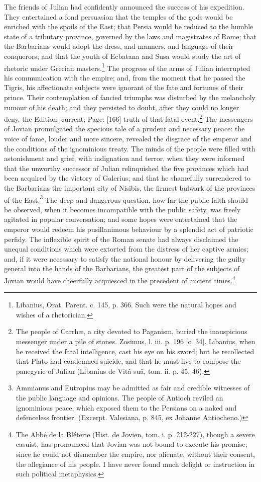 The friends of Julian had confidently announced the success of his expedition. They entertained a fond persuasion that the temples of the gods would be enriched with the spoils of the East; that Persia would be reduced to the humble state of a tributary province, governed by the laws and magistrates of Rome; that the Barbarians would adopt the dress, and manners, and language of their conquerors; and that the youth of Ecbatana and Susa would study the art of rhetoric under Grecian masters.\footnote{Libanius, Orat. Parent. c. 145, p. 366. Such were the natural hopes and wishes of a rhetorician.} The progress of the arms of Julian interrupted his communication with the empire; and, from the moment that he passed the Tigris, his affectionate subjects were ignorant of the fate and fortunes of their prince. Their contemplation of fancied triumphs was disturbed by the melancholy rumour of his death; and they persisted to doubt, after they could no longer deny, the Edition: current; Page: [166] truth of that fatal event.\footnote{The people of Carrhæ, a city devoted to Paganism, buried the inauspicious messenger under a pile of stones. Zosimus, l. iii. p. 196 [c. 34]. Libanius, when he received the fatal intelligence, cast his eye on his sword; but he recollected that Plato had condemned suicide, and that he must live to compose the panegyric of Julian (Libanius de Vitâ suâ, tom. ii. p. 45, 46).} The messengers of Jovian promulgated the specious tale of a prudent and necessary peace: the voice of fame, louder and more sincere, revealed the disgrace of the emperor and the conditions of the ignominious treaty. The minds of the people were filled with astonishment and grief, with indignation and terror, when they were informed that the unworthy successor of Julian relinquished the five provinces which had been acquired by the victory of Galerius; and that he shamefully surrendered to the Barbarians the important city of Nisibis, the firmest bulwark of the provinces of the East.\footnote{Ammianus and Eutropius may be admitted as fair and credible witnesses of the public language and opinions. The people of Antioch reviled an ignominious peace, which exposed them to the Persians on a naked and defenceless frontier. (Excerpt. Valesiana, p. 845, ex Johanne Antiocheno.)} The deep and dangerous question, how far the public faith should be observed, when it becomes incompatible with the public safety, was freely agitated in popular conversation; and some hopes were entertained that the emperor would redeem his pusillanimous behaviour by a splendid act of patriotic perfidy. The inflexible spirit of the Roman senate had always disclaimed the unequal conditions which were extorted from the distress of her captive armies; and, if it were necessary to satisfy the national honour by delivering the guilty general into the hands of the Barbarians, the greatest part of the subjects of Jovian would have cheerfully acquiesced in the precedent of ancient times.\footnote{The Abbé de la Bléterie (Hist. de Jovien, tom. i. p. 212-227), though a severe casuist, has pronounced that Jovian was not bound to execute his promise; since he could not dismember the empire, nor alienate, without their consent, the allegiance of his people. I have never found much delight or instruction in such political metaphysics.}

